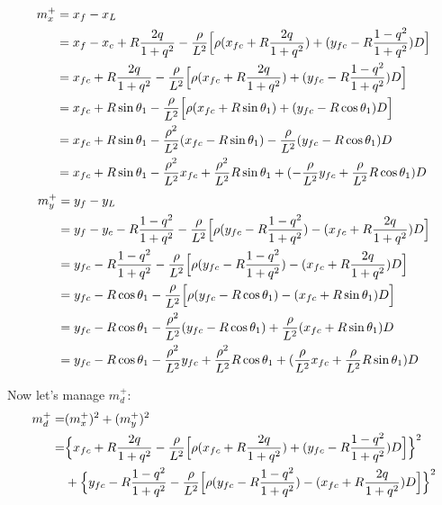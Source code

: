 \documentclass[12pt]{article}
\begin{document}
\begin{align}
    m^+_x &= x_f - x_L\\
    &= x_f - x_c +R\frac{2q}{1+q^2} -\frac{\rho}{L^2}\Bigl[\rho(x_{fc} + R\frac{2q}{1+q^2}) + (y_{fc}-R\frac{1-q^2}{1+q^2})D\Bigr]\\
    &= x_{fc} +R\frac{2q}{1+q^2} -\frac{\rho}{L^2}\Bigl[\rho(x_{fc} + R\frac{2q}{1+q^2}) + (y_{fc}-R\frac{1-q^2}{1+q^2})D\Bigr]\\
    &= x_{fc} +R\sin\theta_1 -\frac{\rho}{L^2}\Bigl[\rho(x_{fc} + R\sin\theta_1) + (y_{fc}-R\cos\theta_1)D\Bigr]\\
    &= x_{fc} +R\sin\theta_1 -\frac{\rho^2}{L^2}(x_{fc} - R\sin\theta_1) - \frac{\rho}{L^2}(y_{fc}-R\cos\theta_1)D\\
    &= x_{fc} +R\sin\theta_1 -\frac{\rho^2}{L^2}x_{fc} + \frac{\rho^2}{L^2}R\sin\theta_1 + (-\frac{\rho}{L^2}y_{fc} +\frac{\rho}{L^2}R\cos\theta_1)D
\end{align}
\begin{align}
    m^+_y &= y_f - y_L\\
    &= y_f - y_c -R\frac{1-q^2}{1+q^2} -\frac{\rho}{L^2}\Bigl[\rho(y_{fc}-R\frac{1-q^2}{1+q^2}) - (x_{fc} + R\frac{2q}{1+q^2})D\Bigr]\\
    &= y_{fc} -R\frac{1-q^2}{1+q^2} -\frac{\rho}{L^2}\Bigl[\rho(y_{fc}-R\frac{1-q^2}{1+q^2}) - (x_{fc} + R\frac{2q}{1+q^2})D\Bigr]\\
    &= y_{fc} -R\cos\theta_1 -\frac{\rho}{L^2}\Bigl[\rho(y_{fc}-R\cos\theta_1) - (x_{fc} + R\sin\theta_1)D\Bigr]\\
    &= y_{fc} -R\cos\theta_1 -\frac{\rho^2}{L^2}(y_{fc}-R\cos\theta_1) + \frac{\rho}{L^2}(x_{fc} + R\sin\theta_1)D\\
    &= y_{fc} -R\cos\theta_1 -\frac{\rho^2}{L^2}y_{fc}+\frac{\rho^2}{L^2}R\cos\theta_1 + (\frac{\rho}{L^2}x_{fc} + \frac{\rho}{L^2}R\sin\theta_1)D
\end{align}

Now let's manage $m_d^+$:
\begin{align}
    m_d^+ =& (m_x^+)^2 + (m_y^+)^2\\
    =& \Bigl\{ x_{fc} +R\frac{2q}{1+q^2} -\frac{\rho}{L^2}\Bigl[\rho(x_{fc} + R\frac{2q}{1+q^2}) + (y_{fc}-R\frac{1-q^2}{1+q^2})D\Bigr] \Bigr\}^2 \nonumber\\
    &+ \Bigl\{ y_{fc} -R\frac{1-q^2}{1+q^2} -\frac{\rho}{L^2}\Bigl[\rho(y_{fc}-R\frac{1-q^2}{1+q^2}) - (x_{fc} + R\frac{2q}{1+q^2})D\Bigr] \Bigr\}^2
\end{align}
\end{document}
